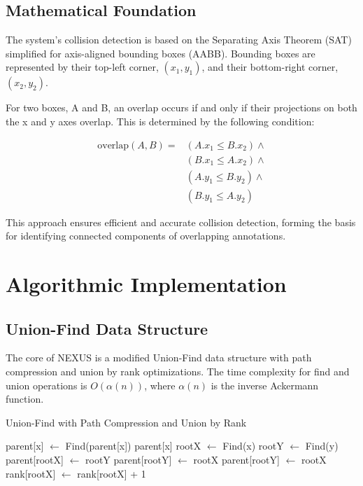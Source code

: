 \documentclass[10pt]{article}
\begin{document}
\subsection{Mathematical Foundation}
The system's collision detection is based on the Separating Axis Theorem (SAT) simplified for axis-aligned bounding boxes (AABB). Bounding boxes are represented by their top-left corner, $(x_1, y_1)$, and their bottom-right corner, $(x_2, y_2)$.

For two boxes, A and B, an overlap occurs if and only if their projections on both the x and y axes overlap. This is determined by the following condition:

\begin{equation}
\begin{split}
    \text{overlap}(A, B) = & (A.x_1 \leq B.x_2) \land \\
    & (B.x_1 \leq A.x_2) \land \\
    & (A.y_1 \leq B.y_2) \land \\
    & (B.y_1 \leq A.y_2)
\end{split}
\end{equation}

This approach ensures efficient and accurate collision detection, forming the basis for identifying connected components of overlapping annotations.

\section{Algorithmic Implementation}
\subsection{Union-Find Data Structure}
The core of NEXUS is a modified Union-Find data structure with path compression and union by rank optimizations. The time complexity for find and union operations is $O(\alpha(n))$, where $\alpha(n)$ is the inverse Ackermann function.

\begin{algorithm}
\caption{Union-Find with Path Compression and Union by Rank}
\begin{algorithmic}[1]
        \State parent[x] $\gets$ Find(parent[x]) 
    \EndIf
    \Return parent[x]
\EndFunction
\Statex
{}
    \State rootX $\gets$ Find(x)
    \State rootY $\gets$ Find(y)
         
            \State parent[rootX] $\gets$ rootY
            \State parent[rootY] $\gets$ rootX
        \Else
            \State parent[rootY] $\gets$ rootX
            \State rank[rootX] $\gets$ rank[rootX] + 1
        \EndIf
    \EndIf
\EndFunction
\end{algorithmic}
\end{algorithm}
\end{document}
